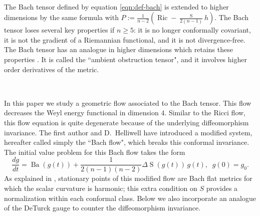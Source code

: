 \documentclass[10pt,reqno]{amsart}
\DeclareMathOperator{\Ric}{Ric}
\DeclareMathOperator{\Ba}{Ba}
\DeclareMathOperator{\Scal}{S}
\begin{document}
\

The Bach tensor defined by equation \eqref{eqn:def-bach} is extended to higher dimensions by the same formula with $P := \frac{1}{n-2} \left( \Ric - \frac{\Scal}{2(n-1)} h\right)$.  The Bach tensor loses several key properties if $n \geq 5$:
it is no longer conformally covariant, it is not the gradient of a Riemannian functional, and it is not divergence-free.  The Bach tensor 
has an analogue in higher dimensions which retains these properties \cite{Graham}. It is called the ``ambient obstruction tensor",  and it involves higher order derivatives of the metric.

\

In this paper we study a geometric flow associated to the Bach tensor.  This flow  decreases the Weyl energy functional in  dimension $4$.  Similar to the Ricci flow, this flow equation is quite degenerate
because of the underlying diffeomorphism invariance.  The first author and D.~Helliwell \cite{BH1} 
have introduced a modified system, hereafter called simply the ``Bach flow", which breaks this conformal invariance. The initial value problem for this Bach flow takes the form
\begin{equation}
\label{BFndim}
\frac{dg}{dt} = \Ba(g(t)) + \frac{1}{2(n-1)(n-2)} \Delta \Scal(g(t)) \, g(t), \; \; g(0) = g_0. 
\end{equation}
As explained in \cite{BGIM2}, stationary points of this modified flow are Bach flat metrics for which the scalar curvature is harmonic; this extra condition on $S$ provides a 
normalization within each conformal class. Below we also incorporate an analogue of the DeTurck gauge to counter the diffeomorphism invariance.  

\
\end{document}

